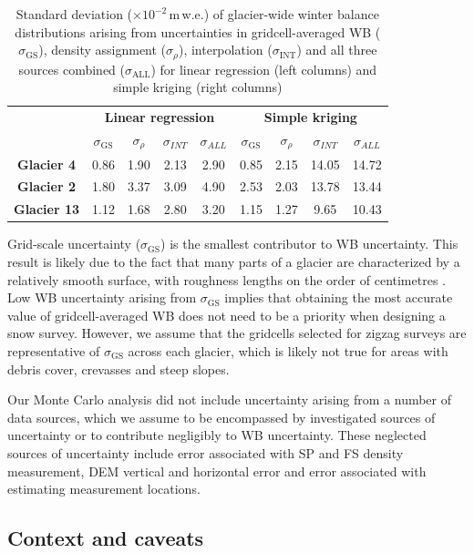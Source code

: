 \documentclass[twocolumn, letterpaper]{igs}
\begin{document}
 \begin{table}[b]
\centering
\caption{Standard deviation ($\times10^{-2}$\,m\,w.e.) of glacier-wide winter balance distributions arising from uncertainties in gridcell-averaged WB ($\sigma_{\mathrm{GS}}$), density assignment ($\sigma_{\rho}$), interpolation ($\sigma_{\mathrm{INT}}$) and all three sources combined ($\sigma_{\mathrm{ALL}}$) for linear regression (left columns) and simple kriging (right columns)}
\label{tab:WSMBdistribution_sigma}
\begin{tabular}{c|cccc|cccc}
 & \multicolumn{4}{c|}{\textbf{Linear regression}} & \multicolumn{4}{c}{\textbf{Simple kriging}} \\
\textbf{} & $\sigma_{\mathrm{GS}}$ & $\sigma_{\rho}$ & $\sigma_{INT}$ & $\sigma_{ALL}$ & $\sigma_{\mathrm{GS}}$ & $\sigma_{\rho}$ & $\sigma_{INT}$ & $\sigma_{ALL}$ \\ \hline
\textbf{Glacier 4} & 0.86 & 1.90 & 2.13 & 2.90 & 0.85 & 2.15 & 14.05 & 14.72 \\
\textbf{Glacier 2} & 1.80 & 3.37 & 3.09 & 4.90 & 2.53 & 2.03 & 13.78 & 13.44 \\
\textbf{Glacier 13} & 1.12 & 1.68 & 2.80 & 3.20 & 1.15 & 1.27 & 9.65 & 10.43
\end{tabular}
\end{table}

Grid-scale uncertainty ($\sigma_{\mathrm{GS}}$) is the smallest contributor to WB uncertainty. This result is likely due to the fact that many parts of a glacier are characterized by a relatively smooth surface, with roughness lengths on the order of centimetres \citep[e.g.][]{Hock2005}. Low WB uncertainty arising from $\sigma_{\mathrm{GS}}$ implies that obtaining the most accurate value of gridcell-averaged WB does not need to be a priority when designing a snow survey. However, we assume that the gridcells selected for zigzag surveys are representative of $\sigma_{\mathrm{GS}}$ across each glacier, which is likely not true for areas with debris cover, crevasses and steep slopes.

Our Monte Carlo analysis did not include uncertainty arising from a number of data sources, which we assume to be encompassed by investigated sources of uncertainty or to contribute negligibly to WB uncertainty. These neglected sources of uncertainty include error associated with SP and FS density measurement, DEM vertical and horizontal error and error associated with estimating measurement locations.


\subsection{Context and caveats}
\end{document}
